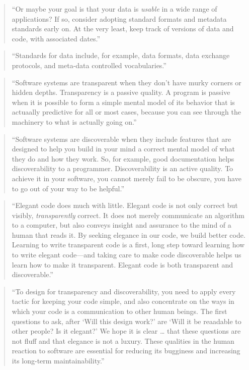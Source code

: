 \documentclass[]{tufte-book}
\begin{document}
\begin{quote}
``Or maybe your goal is that your data is \emph{usable} in a wide range of
applications? If so, consider adopting standard formats and metadata
standards early on. At the very least, keep track of versions of data
and code, with associated dates.'' \citep{goodman2014ten}
\end{quote}

\begin{quote}
``Standards for data include, for example, data formats, data exchange
protocols, and meta-data controlled vocabularies.'' \citep{barga2011bioinformatics}
\end{quote}

\begin{quote}
``Software systems are transparent when they don't have murky corners or hidden
depths. Transparency is a passive quality. A program is passive when it is possible
to form a simple mental model of its behavior that is actuaally predictive for all
or most cases, because you can see through the machinery to what is actually going
on.'' \citep{raymond2003art}
\end{quote}

\begin{quote}
``Software systems are discoverable when they include features that are designed
to help you build in your mind a correct mental model of what they do and how they
work. So, for example, good documentation helps discoverability to a programmer. Discoverability
is an active quality. To achieve it in your software, you cannot merely fail to be obscure,
you have to go out of your way to be helpful.'' \citep{raymond2003art}
\end{quote}

\begin{quote}
``Elegant code does much with little. Elegant code is not only correct but visibly,
\emph{transparently} correct. It does not merely communicate an algorithm to a computer,
but also conveys insight and assurance to the mind of a human that reads it. By seeking
elegance in our code, we build better code. Learning to write transparent code is a first,
long step toward learning how to write elegant code---and taking care to make code
discoverable helps us learn how to make it transparent. Elegant code is both transparent and
discoverable.'' \citep{raymond2003art}
\end{quote}

\begin{quote}
``To design for transparency and discoverability, you need to apply every tactic for
keeping your code simple, and also concentrate on the ways in which your code is a
communication to other human beings. The first questions to ask, after `Will this design
work?' are `Will it be reaadable to other people? Is it elegant?' We hope it is clear \ldots{}
that these questions are not fluff and that elegance is not a luxury. These qualities
in the human reaction to software are essential for reducing its bugginess and
increasing its long-term maintainability.'' \citep{raymond2003art}
\end{quote}
\end{document}
